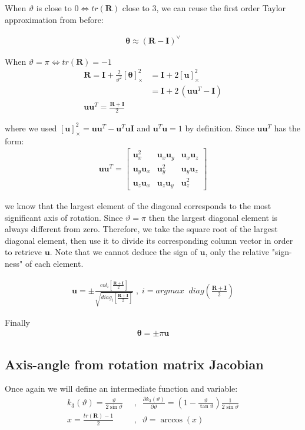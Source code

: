 \documentclass{article}
\renewcommand\aa{\bm{\theta}}
\renewcommand\t{\vartheta}
\newcommand\R{\bm{R}}
\newcommand\I{\bm{I}}
\renewcommand\u{\bm{u}}
\renewcommand\skew[1]{[#1]_{\times}}
\begin{document}
When $\t$ is close to $0 \iff tr(\R)$ close to $3$, we can reuse the first
order Taylor approximation from before:

\begin{align}
  \aa \approx \left( \R - \I \right)^\vee
\end{align}

When $\t = \pi \iff tr(\R) = -1$
\begin{align}
  \R = \I + \frac{2}{\t^2} \skew{\aa}^2 
  &= \I + 2\skew{\u}^2 \\
  &= \I + 2\, (\u \u^T - \I) \\
  \u \u^T = \frac{\R + \I }{2}
\end{align}

where we used $\skew{\u}^2 =  \u \u^T - \u^T \u \I$ and $\u^T \u = 1$ by definition.
Since $\u \u^T$ has the form:
\begin{align}
  \u \u^T = 
  \begin{bmatrix}
    \u_x^2 & \u_x \u_y & \u_x \u_z \\
    \u_y \u_x & \u_y^2 & \u_y \u_z \\
    \u_z \u_x & \u_z \u_y & \u_z^2
  \end{bmatrix}
\end{align}

we know that the largest element of the diagonal corresponds to the most
significant axis of rotation. Since $\t=\pi$ then the largest diagonal element
is always different from zero. Therefore, we take the square root of the largest
diagonal element, then use it to divide its corresponding column vector in
order to retrieve $\u$. Note that we cannot deduce the sign of $\u$, only the
relative "sign-ness" of each element.

\begin{align}
  \u = \pm 
    \frac{col_i \left[ \frac{\R + \I}{2} \right] }
         {\sqrt{diag_i \left[ \frac{\R + \I }{2} \right] }}
  \;,\; i = argmax \;\; diag \left( \frac{\R + \I }{2} \right)
\end{align}

Finally
\begin{align}
  \aa = \pm \pi \u
\end{align}

\subsection{Axis-angle from rotation matrix Jacobian}
Once again we will define an intermediate function and variable:
\begin{align}
  k_3(\t) = \frac{\t}{2\sin{\t}} \;\;&,\;\;
  \frac{\partial k_3(\t)}{\partial \t} = 
    \left(1 - \frac{\t}{\tan{\t}} \right) \frac{1}{2\sin{\t}} \\
  x = \frac{tr(\R) - 1}{2} \;\;&,\;\; \t = \arccos(x)
\end{align}
\end{document}
